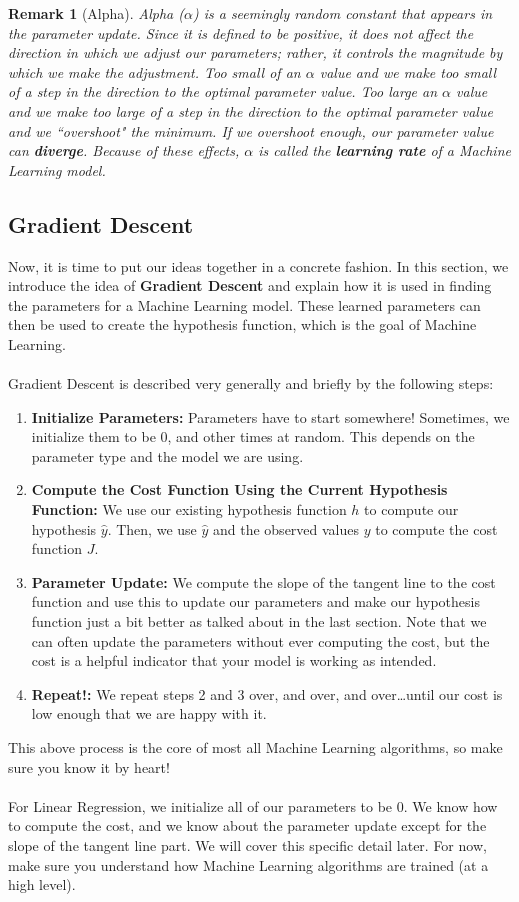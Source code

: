 \documentclass{article}
\newtheorem*{remark}{Remark}
\begin{document}
\begin{remark}[Alpha]
Alpha ($\alpha$) is a seemingly random constant that appears in the parameter update. Since it is defined to be positive, it does not affect the direction in which we adjust our parameters; rather, it controls the magnitude by which we make the adjustment. Too small of an $\alpha$ value and we make too small of a step in the direction to the optimal parameter value. Too large an $\alpha$ value and we make too large of a step in the direction to the optimal parameter value and we ``overshoot" the minimum. If we overshoot enough, our parameter value can \textbf{diverge}. Because of these effects, $\alpha$ is called the \textbf{learning rate} of a Machine Learning model. 
\end{remark}

\subsection{Gradient Descent}
Now, it is time to put our ideas together in a concrete fashion. In this section, we introduce the idea of \textbf{Gradient Descent} and explain how it is used in finding the parameters for a Machine Learning model. These learned parameters can then be used to create the hypothesis function, which is the goal of Machine Learning. 
\\
\\
Gradient Descent is described very generally and briefly by the following steps:
\begin{enumerate}
    \item \textbf{Initialize Parameters:} Parameters have to start somewhere! Sometimes, we initialize them to be 0, and other times at random. This depends on the parameter type and the model we are using.
    \item \textbf{Compute the Cost Function Using the Current Hypothesis Function:} We use our existing hypothesis function $h$ to compute our hypothesis $\hat{y}$. Then, we use $\hat{y}$ and the observed values $y$ to compute the cost function $J$. 
    \item \textbf{Parameter Update:} We compute the slope of the tangent line to the cost function and use this to update our parameters and make our hypothesis function just a bit better as talked about in the last section. Note that we can often update the parameters without ever computing the cost, but the cost is a helpful indicator that your model is working as intended.
    \item \textbf{Repeat!:} We repeat steps 2 and 3 over, and over, and over\ldots until our cost is low enough that we are happy with it. 
\end{enumerate}
This above process is the core of most all Machine Learning algorithms, so make sure you know it by heart!
\\
\\
For Linear Regression, we initialize all of our parameters to be 0. We know how to compute the cost, and we know about the parameter update except for the slope of the tangent line part. We will cover this specific detail later. For now, make sure you understand how Machine Learning algorithms are trained (at a high level).
\end{document}
